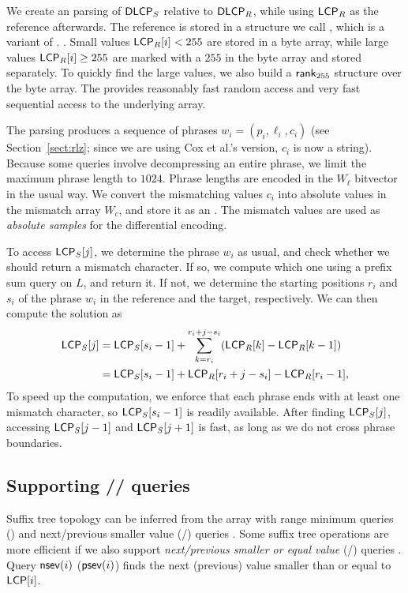 We create an \RLZ{} parsing of $\mathsf{DLCP}_{S}$ relative to $\mathsf{DLCP}_{R}$, while
using $\mathsf{LCP}_{R}$ as the reference afterwards. The reference is stored in a
structure we call \slarray, which is a variant of \LCPbyte.
\cite{Abouelhoda2004}. Small values $\mathsf{LCP}_{R}[i] < 255$ are stored in a byte
array, while large values $\mathsf{LCP}_{R}[i] \ge 255$ are marked with a $255$ in the
byte array and stored separately. To quickly find the large values, we also
build a $\mathsf{rank}_{255}$ structure over the byte array. The \slarray{} provides
reasonably fast random access and very fast sequential access to the
underlying array.

The \RLZ{} parsing produces a sequence of phrases $w_{i} = (p_{i}, \ell_{i},
c_{i})$ (see Section~\ref{sect:rlz}; since we are using Cox et al.'s version, $c_{i}$ is now a string).
Because some queries involve decompressing an entire phrase, we limit the maximum phrase length to $1024$.
Phrase lengths are encoded in the $W_{\ell}$ bitvector in the usual way. We convert the mismatching \DLCP{}
values $c_{i}$ into absolute \LCP{} values in the mismatch array $W_{c}$, and
store it as an \slarray. The mismatch values are used as \emph{absolute
samples} for the differential encoding.

To access $\mathsf{LCP}_{S}[j]$, we determine the phrase $w_{i}$ as usual, and check whether we should return a mismatch character. If so, we compute which one using a prefix sum query on $L$, and return it.  If not, we determine the starting positions $r_{i}$ and $s_{i}$ of the phrase $w_{i}$ in the reference and the target, respectively. We can then compute the solution as
\begin{align*}
\mathsf{LCP}_{S}[j] &= \mathsf{LCP}_{S}[s_{i} - 1] + \sum_{k = r_{i}}^{r_{i} + j - s_{i}}
(\mathsf{LCP}_{R}[k] - \mathsf{LCP}_{R}[k-1]) \\
&= \mathsf{LCP}_{S}[s_{i} - 1] + \mathsf{LCP}_{R}[r_{i} + j - s_{i}] - \mathsf{LCP}_{R}[r_{i} - 1],
\end{align*}
To speed up the computation, we enforce that each \RLZ{} phrase ends with at least one mismatch character, so $\mathsf{LCP}_{S}[s_{i} - 1]$ is readily available. After finding $\mathsf{LCP}_{S}[j]$, accessing $\mathsf{LCP}_{S}[j-1]$ and $\mathsf{LCP}_{S}[j+1]$ is fast, as long as we do not cross phrase boundaries.

\subsection{Supporting \nsv/\psv/\rmq{} queries}

Suffix tree topology can be inferred from the \LCP{} array with range minimum
queries (\rmq) and next/previous smaller value (\nsv/\psv) queries
\cite{Fischer2009a}. Some suffix tree operations are more efficient
if we also support \emph{next/previous smaller or equal value} (\nsev/\psev)
queries \cite{Abeliuk2013}. Query $\mathsf{nsev}(i)$ ($\mathsf{psev}(i)$) finds the next
(previous) value smaller than or equal to $\mathsf{LCP}[i]$.

